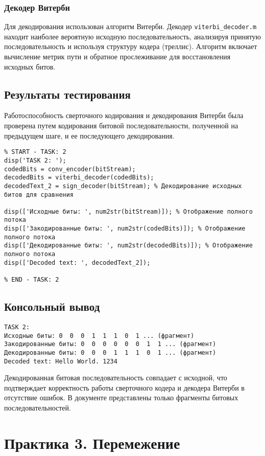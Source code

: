 \subsubsection{Декодер Витерби}
Для декодирования использован алгоритм Витерби. Декодер \texttt{viterbi\_decoder.m} находит наиболее вероятную исходную последовательность, анализируя принятую последовательность и используя структуру кодера (треллис). Алгоритм включает вычисление метрик пути и обратное прослеживание для восстановления исходных битов.

\subsection{Результаты тестирования}
Работоспособность сверточного кодирования и декодирования Витерби была проверена путем кодирования битовой последовательности, полученной на предыдущем шаге, и ее последующего декодирования.

\begin{verbatim}
% START - TASK: 2
disp('TASK 2: ');
codedBits = conv_encoder(bitStream);
decodedBits = viterbi_decoder(codedBits);
decodedText_2 = sign_decoder(bitStream); % Декодирование исходных битов для сравнения

disp(['Исходные биты: ', num2str(bitStream)]); % Отображение полного потока
disp(['Закодированные биты: ', num2str(codedBits)]); % Отображение полного потока
disp(['Декодированные биты: ', num2str(decodedBits)]); % Отображение полного потока
disp(['Decoded text: ', decodedText_2]);

% END - TASK: 2
\end{verbatim}

\subsection{Консольный вывод}
\begin{verbatim}
TASK 2:
Исходные биты: 0  0  0  1  1  1  0  1 ... (фрагмент)
Закодированные биты: 0  0  0  0  0  0  1  1 ... (фрагмент)
Декодированные биты: 0  0  0  1  1  1  0  1 ... (фрагмент)
Decoded text: Hello World. 1234
\end{verbatim}
Декодированная битовая последовательность совпадает с исходной, что подтверждает корректность работы сверточного кодера и декодера Витерби в отсутствие ошибок. В документе представлены только фрагменты битовых последовательностей.

\section{Практика 3. Перемежение}

